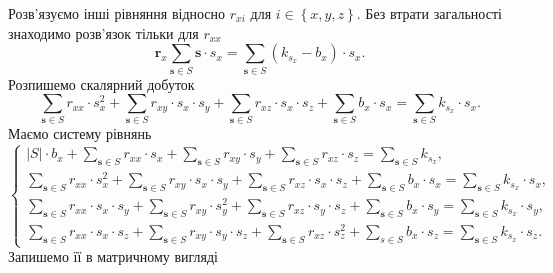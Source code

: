 Розв'язуємо інші рівняння відносно $r_{xi}$ для
$i \in \left\{ x, y, z \right\} $.
Без втрати загальності знаходимо розв'язок тільки для $r_{xx}$
\begin{equation*}
  \boldsymbol{r}_x \sum \limits_{\boldsymbol{s} \in S} \boldsymbol{s} \cdot s_x =
  \sum \limits_{\boldsymbol{s} \in S} \left( k_{s_x} - b_x \right) \cdot s_x.
\end{equation*}
Розпишемо скалярний добуток
\begin{equation*}
  \sum \limits_{\boldsymbol{s} \in S} r_{xx} \cdot s_x^2 +
  \sum \limits_{\boldsymbol{s} \in S} r_{xy} \cdot s_x \cdot s_y +
  \sum \limits_{\boldsymbol{s} \in S} r_{xz} \cdot s_x \cdot s_z +
  \sum \limits_{\boldsymbol{s} \in S} b_x \cdot s_x =
  \sum \limits_{\boldsymbol{s} \in S} k_{s_x} \cdot s_x.
\end{equation*}
Маємо систему рівнянь
\begin{equation*}
  \begin{cases}
    \left| S \right| \cdot b_x + \sum \limits_{\boldsymbol{s} \in S} r_{xx} \cdot s_x +
    \sum \limits_{\boldsymbol{s} \in S} r_{xy} \cdot s_y +
    \sum \limits_{\boldsymbol{s} \in S} r_{xz} \cdot s_z  =
    \sum \limits_{\boldsymbol{s} \in S} k_{s_x}, \\
    \sum \limits_{\boldsymbol{s} \in S} r_{xx} \cdot s_x^2 +
    \sum \limits_{\boldsymbol{s} \in S} r_{xy} \cdot s_x \cdot s_y +
    \sum \limits_{\boldsymbol{s} \in S} r_{xz} \cdot s_x \cdot s_z +
    \sum \limits_{\boldsymbol{s} \in S} b_x \cdot s_x =
    \sum \limits_{\boldsymbol{s} \in S} k_{s_x} \cdot s_x, \\
    \sum \limits_{\boldsymbol{s} \in S} r_{xx} \cdot s_x \cdot s_y +
    \sum \limits_{\boldsymbol{s} \in S} r_{xy} \cdot s_y^2 +
    \sum \limits_{\boldsymbol{s} \in S} r_{xz} \cdot s_y \cdot s_z +
    \sum \limits_{\boldsymbol{s} \in S} b_x \cdot s_y =
    \sum \limits_{\boldsymbol{s} \in S} k_{s_x} \cdot s_y, \\
    \sum \limits_{\boldsymbol{s} \in S} r_{xx} \cdot s_x \cdot s_z +
    \sum \limits_{\boldsymbol{s} \in S} r_{xy} \cdot s_y \cdot s_z +
    \sum \limits_{\boldsymbol{s} \in S} r_{xz} \cdot s_z^2 +
    \sum \limits_{s \in S} b_x \cdot s_z =
    \sum \limits_{\boldsymbol{s} \in S} k_{s_x} \cdot s_z.
  \end{cases}
\end{equation*}
Запишемо її в матричному вигляді
